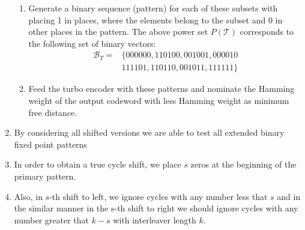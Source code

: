 \documentclass[fontsize=12pt]{article}
\begin{document}
\begin{enumerate}
\begin{enumerate}
\item Generate a binary sequence (pattern) for each of these subsets with placing 1 in places, where the elements belong to the subset and 0 in other places in the pattern. The above power set $P(\mathcal{T})$ corresponds to the following set of binary vectors:
\[
\begin{aligned}
\mathcal{B}_{T}=&\{000000,110100,001001,000010\\
&111101,110110,001011,111111\}
\end{aligned}
\]
\item Feed the turbo encoder with these patterns and nominate the Hamming weight of the output codeword with less Hamming weight as minimum free distance.
\end{enumerate}
\item By considering all shifted versions we are able to test all extended binary fixed point patterns

\item In order to obtain a true cycle shift, we place $s$ zeros at the beginning of the primary pattern.

\item Also, in $s$-th shift to left,
we ignore cycles with any number less that $s$ and in the similar
manner in the s-th shift to right we should ignore cycles with
any number greater that $k-s$ with interleaver length $k$.
\end{enumerate}
\end{document}
